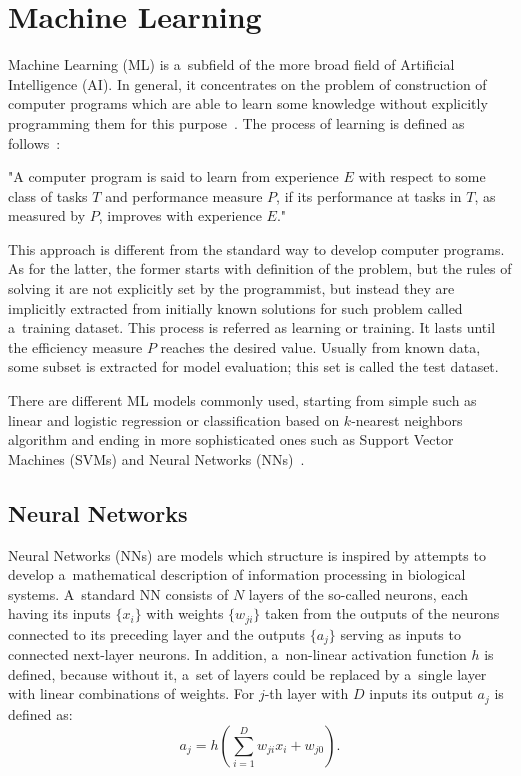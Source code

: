 \section{Machine Learning}

Machine Learning (ML) is a~subfield of the more broad field of Artificial Intelligence (AI). In general, it concentrates on the problem of construction of computer programs which are able to learn some knowledge without explicitly programming them for this purpose~\cite{geron-machine-learning}. The process of learning is defined as follows~\cite{mitchell-machine-learning}:
\begin{displayquote}
    "A computer program is said to learn from experience $E$ with respect to some class of tasks $T$ and performance measure $P$, if its performance at tasks in $T$, as measured by $P$, improves with experience $E$."
\end{displayquote}

This approach is different from the standard way to develop computer programs. As for the latter, the former starts with definition of the problem, but the rules of solving it are not explicitly set by the programmist, but instead they are implicitly extracted from initially known solutions for such problem called a~training dataset. This process is referred as learning or training. It lasts until the efficiency measure $P$ reaches the desired value. Usually from known data, some subset is extracted for model evaluation; this set is called the test dataset.

There are different ML models commonly used, starting from simple such as linear and logistic regression or classification based on $k$-nearest neighbors algorithm and ending in more sophisticated ones such as Support Vector Machines (SVMs) and Neural Networks (NNs)~\cite{geron-machine-learning}.

\subsection{Neural Networks}

Neural Networks (NNs) are models which structure is inspired by attempts to develop a~mathematical description of information processing in biological systems. A~standard NN consists of $N$ layers of the so-called neurons, each having its inputs $\{ x_i \}$ with weights $\{ w_{ji} \}$ taken from the outputs of the neurons connected to its preceding layer and the outputs $\{ a_j \}$ serving as inputs to connected next-layer neurons. In addition, a~non-linear activation function $h$ is defined, because without it, a~set of layers could be replaced by a~single layer with linear combinations of weights. For $j$-th layer with $D$ inputs its output $a_j$ is defined as:
\begin{equation}
    a_j = h\left( \sum_{i = 1}^D w_{ji} x_i + w_{j0} \right).
\end{equation}

